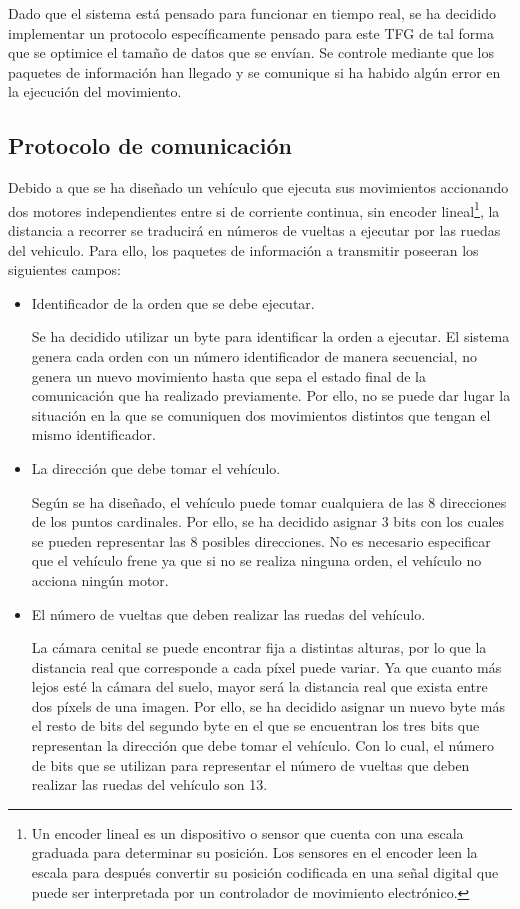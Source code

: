 Dado que el sistema está pensado para funcionar en tiempo real, se ha decidido implementar un protocolo específicamente pensado para este \ac{TFG} de tal forma que se optimice el tamaño de datos que se envían. Se controle mediante  que los paquetes de información han llegado y se comunique si ha habido algún error en la ejecución del movimiento. 

\subsection{Protocolo de comunicación}\label{subsec:Protocolo}

Debido a que se ha diseñado un vehículo que ejecuta sus movimientos accionando dos motores independientes entre si de corriente continua, sin encoder lineal\footnote{Un encoder lineal es un dispositivo o sensor que cuenta con una escala graduada para determinar su posición. Los sensores en el encoder leen la escala para después convertir su posición codificada en una señal digital que puede ser interpretada por un controlador de movimiento electrónico.}, la distancia a recorrer se traducirá en números de vueltas a ejecutar por las ruedas del vehiculo. Para ello, los paquetes de información a transmitir poseeran los siguientes campos:

\begin{itemize}
\item Identificador de la orden que se debe ejecutar. 

Se ha decidido utilizar un byte para identificar la orden a ejecutar. El sistema genera cada orden con un número identificador de manera secuencial, no genera un nuevo movimiento hasta que sepa el estado final de la comunicación que ha realizado previamente. Por ello, no se puede dar lugar la situación en la que se comuniquen dos movimientos distintos que tengan el mismo identificador.%
\item La dirección que debe tomar el vehículo.

Según se ha diseñado, el vehículo puede tomar cualquiera de las 8 direcciones de los puntos cardinales. Por ello, se ha decidido asignar 3 bits con los cuales se pueden representar las 8 posibles direcciones. No es necesario especificar que el vehículo frene ya que si no se realiza ninguna orden, el vehículo no acciona ningún motor.
\item El número de vueltas que deben realizar las ruedas del vehículo.

La cámara cenital se puede encontrar fija a distintas alturas, por lo que la distancia real que corresponde a cada píxel puede variar. Ya que cuanto más lejos esté la cámara del suelo, mayor será la distancia real que exista entre dos píxels de una imagen. Por ello, se ha decidido asignar un nuevo byte más el resto de bits del segundo byte en el que se encuentran los tres bits que representan la dirección que debe tomar el vehículo. Con lo cual, el número de bits que se utilizan para representar el número de vueltas que deben realizar las ruedas del vehículo son 13. 
\end{itemize}

